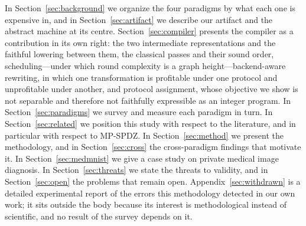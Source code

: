 \documentclass[11pt]{article}
\begin{document}
In Section~\ref{sec:background} we organize the four paradigms by what each one is
expensive in, and in Section~\ref{sec:artifact} we describe our artifact and the
abstract machine at its centre. Section~\ref{sec:compiler} presents the compiler as a
contribution in its own right: the two intermediate representations and the faithful
lowering between them, the classical passes and their sound order, scheduling---under
which round complexity is a graph height---backend-aware rewriting, in which one
transformation is profitable under one protocol and unprofitable under another, and
protocol assignment, whose objective we show is not separable and therefore not
faithfully expressible as an integer program. In Section~\ref{sec:paradigms} we
survey and measure each paradigm in turn. In Section~\ref{sec:related} we position this study with respect to
the literature, and in particular with respect to MP-SPDZ. In
Section~\ref{sec:method} we present the methodology, and in
Section~\ref{sec:cross} the cross-paradigm findings that motivate it. In
Section~\ref{sec:medmnist} we give a case study on private medical image diagnosis. In
Section~\ref{sec:threats} we state the threats to validity, and in
Section~\ref{sec:open} the problems that remain open.
Appendix~\ref{sec:withdrawn} is a detailed experimental report of the errors this
methodology detected in our own work; it sits outside the body because its interest
is methodological instead of scientific, and no result of the survey depends on it.
\end{document}
